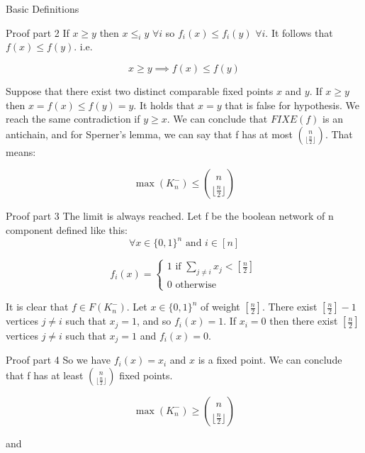 \documentclass{beamer}
\newcommand{\floor}[1]{\lfloor #1 \rfloor}
\begin{document}
\begin{section}{Basic Definitions}
\begin{frame}
\begin{block}{Proof part 2}
If $x \geq y$ then $x \leq_i y$ $ \forall i$ so $f_i(x) \leq f_i(y)$ $ \forall i$. It follows that $f(x) \leq f(y)$. i.e.

\[
    x \geq y \implies f(x) \leq f(y)
\]

Suppose that there exist two distinct comparable fixed points $x$ and $y$. If $x \geq y$ then $x = f(x) \leq f(y) = y$. It holds that $x = y$ that is false for hypothesis. We reach the same contradiction if $y \geq x$. We can conclude that $FIXE(f)$ is an antichain, and for Sperner's lemma, we can say that f has at most $\binom{n}{\floor{\frac{n}{2}}}$. That means:

\[
\max(K_n^-) \leq \binom{n}{\floor{\frac{n}{2}}}
\]

    
\end{block}
\end{frame}

\begin{frame}
\begin{block}{Proof part 3}
    The limit is always reached. Let f be the boolean network of n component defined like this:
    \[
        \forall x \in \{0,1\}^n \text{ and } i \in [n]
    \]
    
    \[
    f_i(x) = 
    \begin{cases}
        1 \text{ if } \sum_{j \neq i}x_j < [\frac{n}{2}] \\
        0 \text{ otherwise }
    \end{cases}
    \]
    
    
    It is clear that $f \in F(K_n^-)$. Let $x \in \{0, 1\}^n$ of weight $[\frac {n}{2}]$. There exist $[\frac {n}{2}] - 1$ vertices $j \neq i$ such that $x_j = 1$, and so $f_i(x) = 1$. If $x_i = 0$ then there exist $[\frac {n}{2}]$ vertices $j \neq i$ such that $x_j = 1$ and $f_i(x) = 0$.
    
    \end{block}
\end{frame}

\begin{frame}
\begin{block} {Proof part 4}
    So we have $f_i(x) = x_i$ and $x$ is a fixed point. We can conclude that f has at least $\binom{n}{\floor{\frac{n}{2}}}$ fixed points.
    
    \[
        \max(K_n^-) \geq \binom{n}{\floor{\frac{n}{2}}}
    \]
    
    
    and 
    

\end{block}
\end{frame}
\end{section}
\end{document}
